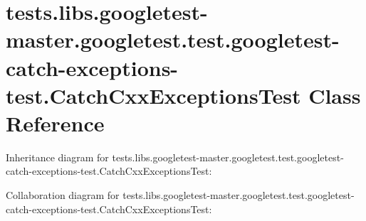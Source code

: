 \hypertarget{classtests_1_1libs_1_1googletest-master_1_1googletest_1_1test_1_1googletest-catch-exceptions-test_1_1CatchCxxExceptionsTest}{}\section{tests.\+libs.\+googletest-\/master.googletest.\+test.\+googletest-\/catch-\/exceptions-\/test.Catch\+Cxx\+Exceptions\+Test Class Reference}
\label{classtests_1_1libs_1_1googletest-master_1_1googletest_1_1test_1_1googletest-catch-exceptions-test_1_1CatchCxxExceptionsTest}


Inheritance diagram for tests.\+libs.\+googletest-\/master.googletest.\+test.\+googletest-\/catch-\/exceptions-\/test.Catch\+Cxx\+Exceptions\+Test\+:


Collaboration diagram for tests.\+libs.\+googletest-\/master.googletest.\+test.\+googletest-\/catch-\/exceptions-\/test.Catch\+Cxx\+Exceptions\+Test\+:
